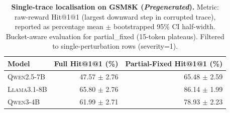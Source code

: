 \begin{table}[t]
\centering
\small
\renewcommand{\arraystretch}{1.08}
\begin{tabular}{l r r}
\toprule
\textbf{Model} & \textbf{Full Hit@1@1 (\%)} & \textbf{Partial-Fixed Hit@1@1 (\%)} \\
\midrule
\textsc{Qwen2.5-7B} & 47.57 $\pm$ 2.76 & 65.48 $\pm$ 2.59 \\
\textsc{Llama3.1-8B} & 65.80 $\pm$ 2.76 & 86.14 $\pm$ 1.99 \\
\textsc{Qwen3-4B} & 61.99 $\pm$ 2.71 & 78.93 $\pm$ 2.23 \\
\bottomrule
\end{tabular}
\caption{\textbf{Single-trace localisation on GSM8K (\textit{Pregenerated}).} Metric: raw-reward Hit@1@1 (largest downward step in corrupted trace), reported as percentage mean $\pm$ bootstrapped 95\% CI half-width. Bucket-aware evaluation for partial_fixed (15-token plateaus). Filtered to single-perturbation rows (severity=1).}
\label{tab:localisation_hit1at1_pregenerated_full_vs_partial_raw}
\end{table}